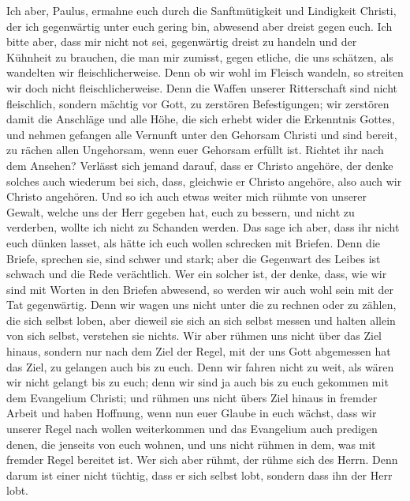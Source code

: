  Ich aber, Paulus, ermahne euch durch die Sanftmütigkeit
und Lindigkeit Christi, der ich gegenwärtig unter euch gering bin,
abwesend aber dreist gegen euch.  Ich bitte aber, dass mir
nicht not sei, gegenwärtig dreist zu handeln und der Kühnheit zu
brauchen, die man mir zumisst, gegen etliche, die uns schätzen, als
wandelten wir fleischlicherweise.  Denn ob wir wohl im
Fleisch wandeln, so streiten wir doch nicht fleischlicherweise.
 Denn die Waffen unserer Ritterschaft sind nicht
fleischlich, sondern mächtig vor Gott, zu zerstören Befestigungen;
 wir zerstören damit die Anschläge und alle Höhe, die sich
erhebt wider die Erkenntnis Gottes, und nehmen gefangen alle Vernunft
unter den Gehorsam Christi  und sind bereit, zu rächen
allen Ungehorsam, wenn euer Gehorsam erfüllt ist.  Richtet
ihr nach dem Ansehen? Verlässt sich jemand darauf, dass er Christo
angehöre, der denke solches auch wiederum bei sich, dass, gleichwie er
Christo angehöre, also auch wir Christo angehören.  Und so
ich auch etwas weiter mich rühmte von unserer Gewalt, welche uns der
Herr gegeben hat, euch zu bessern, und nicht zu verderben, wollte ich
nicht zu Schanden werden.  Das sage ich aber, dass ihr
nicht euch dünken lasset, als hätte ich euch wollen schrecken mit
Briefen.  Denn die Briefe, sprechen sie, sind schwer und
stark; aber die Gegenwart des Leibes ist schwach und die Rede
verächtlich.  Wer ein solcher ist, der denke, dass, wie
wir sind mit Worten in den Briefen abwesend, so werden wir auch wohl
sein mit der Tat gegenwärtig.  Denn wir wagen uns nicht
unter die zu rechnen oder zu zählen, die sich selbst loben, aber dieweil
sie sich an sich selbst messen und halten allein von sich selbst,
verstehen sie nichts.  Wir aber rühmen uns nicht über das
Ziel hinaus, sondern nur nach dem Ziel der Regel, mit der uns Gott
abgemessen hat das Ziel, zu gelangen auch bis zu euch. 
Denn wir fahren nicht zu weit, als wären wir nicht gelangt bis zu euch;
denn wir sind ja auch bis zu euch gekommen mit dem Evangelium Christi;
 und rühmen uns nicht übers Ziel hinaus in fremder Arbeit
und haben Hoffnung, wenn nun euer Glaube in euch wächst, dass wir
unserer Regel nach wollen weiterkommen  und das
Evangelium auch predigen denen, die jenseits von euch wohnen, und uns
nicht rühmen in dem, was mit fremder Regel bereitet ist. 
Wer sich aber rühmt, der rühme sich des Herrn.  Denn
darum ist einer nicht tüchtig, dass er sich selbst lobt, sondern dass
ihn der Herr lobt.


